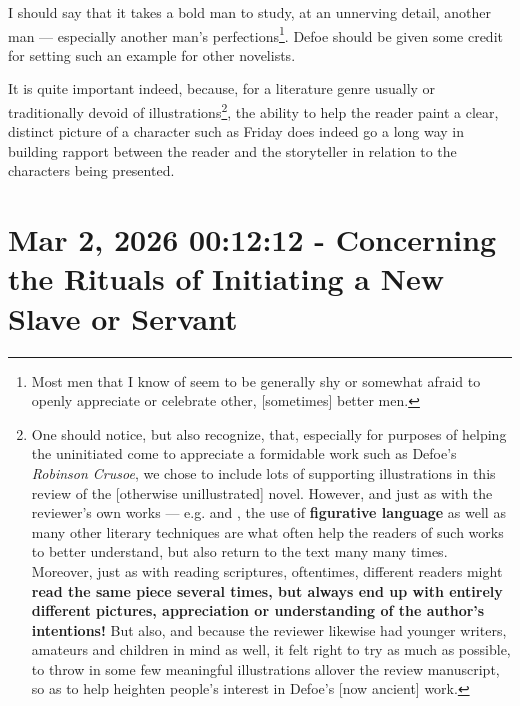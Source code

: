 \documentclass[a4paper]{article}
\begin{document}
I should say that it takes a bold man to study, at an unnerving detail, another man --- especially another man's perfections\footnote{Most men that I know of seem to be generally shy or somewhat afraid to openly appreciate or celebrate other, [sometimes] better men.}. Defoe should be given some credit for setting such an example for other novelists. 

It is quite important indeed, because, for a literature genre usually or traditionally devoid of illustrations\footnote{One should notice, but also recognize, that, especially for purposes of helping the uninitiated come to appreciate a formidable work such as Defoe's \textit{Robinson Crusoe}, we chose to include lots of supporting illustrations in this review of the [otherwise unillustrated] novel. However, and just as with the reviewer's own works --- e.g. \cite{shrinesjwl} and \cite{lutalo2025rock}, the use of \textbf{figurative language} as well as many other literary techniques are what often help the readers of such works to better understand, but also return to the text many many times. Moreover, just as with reading scriptures, oftentimes, different readers might \textbf{read the same piece several times, but always end up with entirely different pictures, appreciation or understanding of the author's intentions!} But also, and because the reviewer likewise had younger writers, amateurs and children in mind as well, it felt right to try as much as possible, to throw in some few meaningful illustrations allover the review manuscript, so as to help heighten people's interest in Defoe's [now ancient] work.}, the ability to help the reader paint a clear, distinct picture of a character such as Friday does indeed go a long way in building rapport between the reader and the storyteller in relation to the characters being presented.

  




\section{Mar 2, 2026 00:12:12 - Concerning the Rituals of Initiating a New Slave or Servant}
\label{SEC52}
\end{document}
